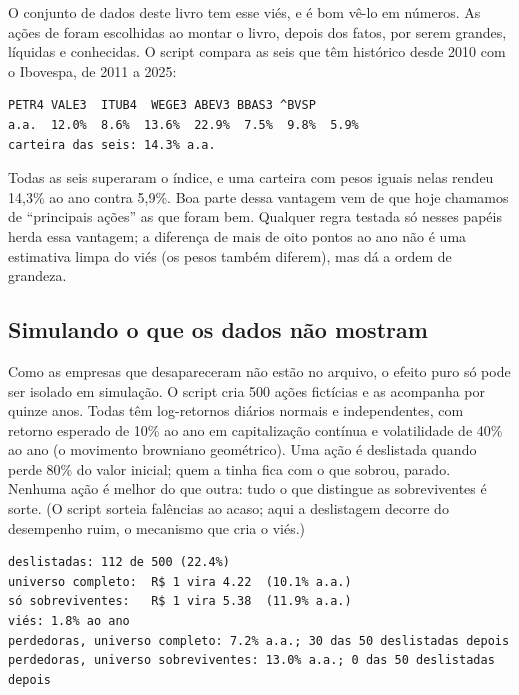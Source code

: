 O conjunto de dados deste livro tem esse viés, e é bom vê-lo em números. As ações de  foram escolhidas ao montar o livro, depois dos fatos, por serem grandes, líquidas e conhecidas. O script  compara as seis que têm histórico desde 2010 com o Ibovespa, de 2011 a 2025:

\begin{lstlisting}[style=saida]
      PETR4 VALE3  ITUB4  WEGE3 ABEV3 BBAS3 ^BVSP
a.a.  12.0%  8.6%  13.6%  22.9%  7.5%  9.8%  5.9%
carteira das seis: 14.3% a.a.
\end{lstlisting}

Todas as seis superaram o índice, e uma carteira com pesos iguais nelas rendeu 14,3\% ao ano contra 5,9\%. Boa parte dessa vantagem vem de que hoje chamamos de ``principais ações'' as que foram bem. Qualquer regra testada só nesses papéis herda essa vantagem; a diferença de mais de oito pontos ao ano não é uma estimativa limpa do viés (os pesos também diferem), mas dá a ordem de grandeza.

\subsection{Simulando o que os dados não mostram}

Como as empresas que desapareceram não estão no arquivo, o efeito puro só pode ser isolado em simulação. O script  cria 500 ações fictícias e as acompanha por quinze anos. Todas têm log-retornos diários normais e independentes, com retorno esperado de 10\% ao ano em capitalização contínua e volatilidade de 40\% ao ano (o movimento browniano geométrico). Uma ação é deslistada quando perde 80\% do valor inicial; quem a tinha fica com o que sobrou, parado. Nenhuma ação é melhor do que outra: tudo o que distingue as sobreviventes é sorte. (O script  sorteia falências ao acaso; aqui a deslistagem decorre do desempenho ruim, o mecanismo que cria o viés.)

\begin{lstlisting}[style=saida]
deslistadas: 112 de 500 (22.4%)
universo completo:  R$ 1 vira 4.22  (10.1% a.a.)
só sobreviventes:   R$ 1 vira 5.38  (11.9% a.a.)
viés: 1.8% ao ano
perdedoras, universo completo: 7.2% a.a.; 30 das 50 deslistadas depois
perdedoras, universo sobreviventes: 13.0% a.a.; 0 das 50 deslistadas depois
\end{lstlisting}


